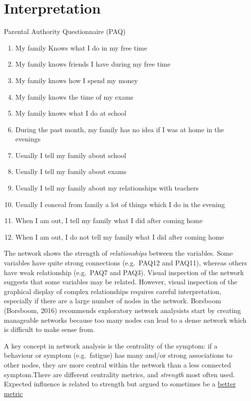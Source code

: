 \documentclass[]{book}
\providecommand{\tightlist}{%
  \setlength{\itemsep}{0pt}\setlength{\parskip}{0pt}}
\begin{document}
\hypertarget{interpretation}{%
\section{Interpretation}\label{interpretation}}

{Parental Authority Questionnaire (PAQ)}

\begin{enumerate}
\def\labelenumi{\arabic{enumi}.}
\tightlist
\item
  My family Knows what I do in my free time
\item
  My family knows friends I have during my free time
\item
  My family knows how I spend my money
\item
  My family knows the time of my exams
\item
  My family knows what I do at school
\item
  During the past month, my family has no idea if I was at home in the evenings
\item
  Usually I tell my family about school
\item
  Usually I tell my family about exams
\item
  Usually I tell my family about my relationships with teachers
\item
  Usually I conceal from family a lot of things which I do in the evening
\item
  When I am out, I tell my family what I did after coming home
\item
  When I am out, I do not tell my family what I did after coming home
\end{enumerate}

The network shows the strength of \emph{relationships} between the variables. Some variables have quite strong connections (e.g.~PAQ12 and PAQ11), whereas others have weak relationship (e.g.~PAQ7 and PAQ3). Visual inspection of the network suggests that some variables may be related. However, visual inspection of the graphical display of complex relationships requires careful interpretation, especially if there are a large number of nodes in the network. Borsboom (Borsboom, 2016) recommends exploratory network analysists start by creating manageable networks because too many nodes can lead to a dense network which is difficult to make sense from.

A key concept in network analysis is the centrality of the symptom: if a behaviour or symptom (e.g.~fatigue) has many and/or strong associations to other nodes, they are more central within the network than a less connected symptom.There are different centrality metrics, and \emph{strength} most often used. Expected influence is related to strength but argued to sometimes be a \href{https://psych-networks.com/expected-influence-new-centrality-metric-robinaugh-et-al-2016/}{better metric}
\end{document}
